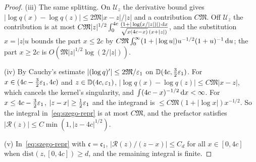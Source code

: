 \begin{proof}
(iii) The same splitting. On $\mathcal U_z$ the derivative bound gives $|\log q(x)-\log q(z)|\le2\mathfrak M|x-z|/|z|$
and a contribution $C\mathfrak M$. Off $\mathcal U_z$ the contribution is at most
$C\mathfrak M|z|^{1/2}\int_0^{4c}\frac{(1+|\log(x/|z|)|)\,\mathrm{d} x}{\sqrt{x(4c-x)}\,(x+|z|)}$, and the substitution
$x=|z|u$ bounds the part $x\le2c$ by $C\mathfrak M\int_0^\infty(1+|\log u|)u^{-1/2}(1+u)^{-1}\,\mathrm{d} u$; the part $x\ge2c$
is $O(\mathfrak M|z|^{1/2}\log(2/|z|))$.

(iv) By Cauchy's estimate $|(\log q)'|\le 2\mathfrak M/\varepsilon_1$ on $\mathbb D(4c,\frac32\varepsilon_1)$. For
$x\in(4c-\frac32\varepsilon_1,4c)$ and $z\in \mathbb D(4c,\varepsilon_1)$, $|\log q(x)-\log q(z)|\le C\mathfrak M|x-z|$, which cancels the
kernel's singularity, and $\int(4c-x)^{-1/2}\,\mathrm{d} x<\infty$. For $x\le4c-\frac32\varepsilon_1$, $|z-x|\ge\frac12\varepsilon_1$ and
the integrand is $\le C\mathfrak M(1+|\log x|)x^{-1/2}$. So the integral in~\eqref{eq:szego-repr} is at most
$C\mathfrak M$, and the prefactor satisfies $|\mathcal R(z)|\le C\min(1,|z-4c|^{1/2})$.

(v) In~\eqref{eq:szego-repr} with $\mathfrak c=\mathfrak c_1$, $|\mathcal R(z)/(z-x)|\le C_d$ for all $x\in[0,4c]$ when
$\mathrm{dist}(z,[0,4c])\ge d$, and the remaining integral is finite.


\end{proof}
